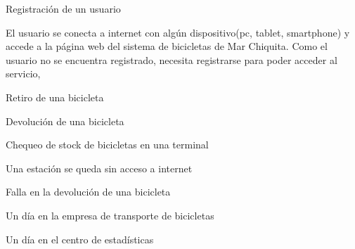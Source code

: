 
\begin{subsection}{Registración de un usuario}

El usuario se conecta a internet con algún dispositivo(pc, tablet, smartphone) y accede a la página
web del sistema de bicicletas de Mar Chiquita. Como el usuario no se encuentra registrado, necesita 
registrarse para poder acceder al servicio,
\end{subsection} 

\begin{subsection}{Retiro de una bicicleta}

\end{subsection} 

\begin{subsection}{Devolución de una bicicleta}

\end{subsection}

\begin{subsection}{Chequeo de stock de bicicletas en una terminal}

\end{subsection}

\begin{subsection}{Una estación se queda sin acceso a internet}

\end{subsection}

\begin{subsection}{Falla en la devolución de una bicicleta}

\end{subsection} 

\begin{subsection}{Un día en la empresa de transporte de bicicletas}

\end{subsection}

\begin{subsection}{Un día en el centro de estadísticas}

\end{subsection}